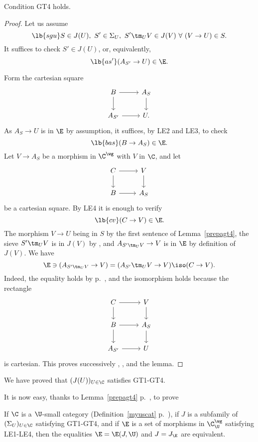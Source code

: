\documentclass[12pt]{article}
\theoremstyle{remark}
\theoremstyle{definition}
\begin{document}
\begin{lem}
Condition GT4 holds.
\end{lem}

\begin{proof} 
Let us assume 
\begin{equation}\lb{sgu}
S\in J(U),\ S'\in\Sigma_U,\ S'\tm_UV\in J(V)\ \forall\ (V\to U)\in S.
\end{equation}
It suffices to check $S'\in J(U)$, or, equivalently, 
\begin{equation}\lb{as'}
(A_{S'}\to U)\in\E.
\end{equation}

Form the cartesian square 
$$
\begin{tikzcd}
B\ar{r}\ar{d}&A_S\ar{d}\\ 
A_{S'}\ar{r}&U.
\end{tikzcd}
$$ 
As $A_S\to U$ is in $\E$ by assumption, it suffices, by LE2 and LE3, to check 
\begin{equation}\lb{bas}
(B\to A_S)\in\E.
\end{equation} 
Let $V\to A_S$ be a morphism in $\C^\wg$ with $V$ in $\C$, and let 
$$
\begin{tikzcd}
C\ar{r}\ar{d}&V\ar{d}\\ 
B\ar{r}&A_S
\end{tikzcd}
$$ 
be a cartesian square. By LE4 it is enough to verify 
\begin{equation}\lb{cv}
(C\to V)\in\E.
\end{equation} 
The morphism $V\to U$ being in $S$ by the first sentence of Lemma~\ref{prepagt4}, the sieve $S'\tm_UV$ is in $J(V)$ by , and $A_{S'\tm_UV}\to V$ is in $\E$ by definition of $J(V)$. We have 
$$
\E\ni(A_{S'\tm_UV}\to V)=(A_{S'}\tm_UV\to V)\iso(C\to V).
$$ 
Indeed, the equality holds by  p.~, and the isomorphism holds because the rectangle 
$$
\begin{tikzcd}
C\ar{r}\ar{d}&V\ar{d}\\ 
B\ar{r}\ar{d}&A_S\ar{d}\\ 
A_{S'}\ar{r}&U
\end{tikzcd}
$$ 
is cartesian. This proves successively , ,  and the lemma.  
\end{proof}

We have proved that $(J(U))_{U\in\C}$ satisfies GT1-GT4. 

It is now easy, thanks to Lemma~\ref{prepagt4} p.~, to prove 

\begin{thm}
If $\C$ is a $\U$-small category (Definition~\ref{myuscat} p.~), if $J$ is a subfamily of $(\Sigma_U)_{U\in\C}$ satisfying GT1-GT4, and if $\E$ is a set of morphisms in $\C^\wg_\U$ satisfying LE1-LE4, then the equalities $\E=\E(J,\U)$ and $J=J_\E$ are equivalent.
\end{thm}
\end{document}
